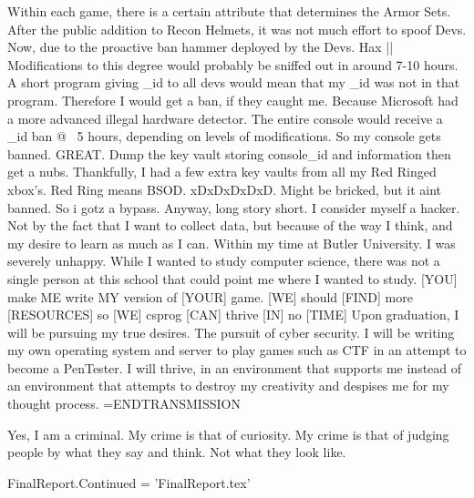 Within each game, there is a certain attribute that determines the Armor Sets.
After the public addition to Recon Helmets, it was not much effort to spoof Devs.
Now, due to the proactive ban hammer deployed by the Devs. Hax || Modifications to this degree
would probably be sniffed out in around 7-10 hours. A short program giving _id to all devs
would mean that my _id was not in that program. Therefore I would get a ban, if they caught me.
Because Microsoft had a more advanced illegal hardware detector. The entire console would receive
a _id ban @ ~5 hours, depending on levels of modifications. 
So my console gets banned. GREAT. Dump the key vault storing console_id and information
then get a nubs. Thankfully, I had a few extra key vaults from all my Red Ringed xbox's.
Red Ring means BSOD. xDxDxDxDxD. Might be bricked, but it aint banned. So i gotz a bypass.
Anyway, long story short. I consider myself a hacker. Not by the fact that I want to collect data,
but because of the way I think, and my desire to learn as much as I can. 
Within my time at Butler University. I was severely unhappy. While I wanted to study computer science,
there was not a single person at this school that could point me where I wanted to study.
[YOU] make {ME} write {MY} version of [YOUR] game.
[WE] should [FIND] more [RESOURCES] so [WE] csprog [CAN] thrive [IN] no [TIME]
Upon graduation, I will be pursuing my true desires. The pursuit of cyber security.
I will be writing my own operating system and server to play games such as CTF
in an attempt to become a PenTester. I will thrive, in an environment that supports me
instead of an environment that attempts to destroy my creativity and despises me for my thought process.
=ENDTRANSMISSION

Yes, I am a criminal. My crime is that of curiosity. 
My crime is that of judging people by what they say and think. 
Not what they look like.

FinalReport.Continued = 'FinalReport.tex'
